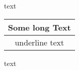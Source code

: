 \documentclass{standalone}
\makeatletter
\newcommand{\mycommand}[2]{\begin{tabular}[t]{@{} c @{}}
    #1\\  \hline
    #2
    \end{tabular}}
\makeatother
\begin{document}
    text \mycommand{Some long Text}{underline text} text
    
\end{document}
